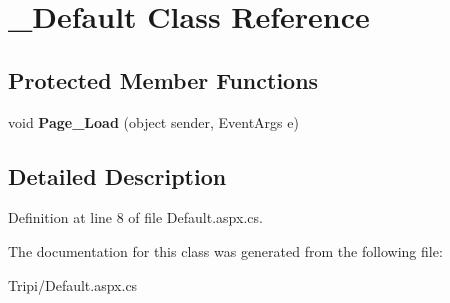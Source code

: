 \hypertarget{class___default}{
\section{\_\-Default Class Reference}
\label{class___default}
}
\subsection*{Protected Member Functions}
\begin{DoxyCompactItemize}
\item 
\hypertarget{class___default_adacf7c92cb8d02f22ce02f0ceed897c1}{
void {\bfseries Page\_\-Load} (object sender, EventArgs e)}
\label{class___default_adacf7c92cb8d02f22ce02f0ceed897c1}

\end{DoxyCompactItemize}


\subsection{Detailed Description}


Definition at line 8 of file Default.aspx.cs.

The documentation for this class was generated from the following file:\begin{DoxyCompactItemize}
\item 
Tripi/Default.aspx.cs\end{DoxyCompactItemize}
